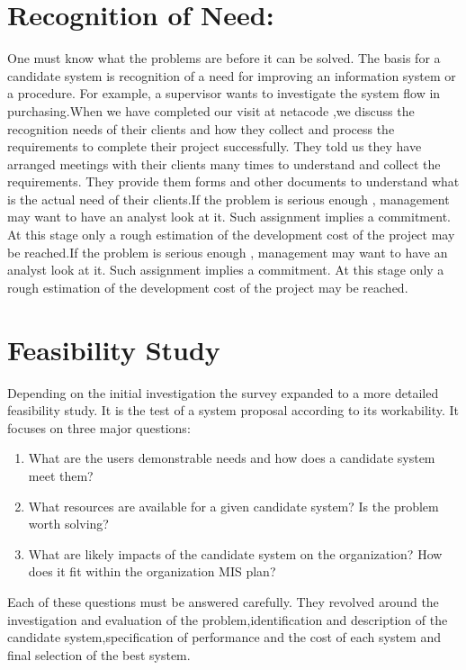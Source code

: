 \documentclass[a4paper,12pt]{report}
\begin{document}
\section{Recognition of Need: }
One must know what the problems are before it can be solved. The basis for a candidate system is recognition of a need for improving an information system or a procedure. For example, a supervisor wants to investigate the system flow in purchasing.When we have completed our visit at netacode ,we discuss the recognition needs of their clients and how they collect and process the requirements to complete their project  successfully. They told us they have arranged meetings with their clients many times to understand and collect the requirements. They provide them forms and other documents to understand what is the actual need of their clients.If the problem is serious enough , management may want to have an analyst look at it. Such assignment  implies a commitment. At this stage only a rough estimation of the development cost of the project may be reached.If the problem is serious enough , management may want to have an analyst look at it. Such assignment  implies a commitment. At this stage only a rough estimation of the development cost of the project may be reached.
\section{Feasibility Study}
Depending on the initial investigation the survey expanded to a more detailed feasibility study. It is the test of a system proposal according to its workability. It focuses on three major questions:
\begin{enumerate}
	\item 	What are the users demonstrable needs and how does a candidate system meet them?
	\item	What resources are available for a given candidate system? Is the problem worth solving?
	\item	What are likely impacts of the candidate system on the organization? How does it fit within the organization MIS plan?
	\end{enumerate}
Each of these questions must be answered carefully. They revolved around the investigation and evaluation of the problem,identification and description of the candidate system,specification of performance and the cost of each system and final selection of the best system.\\ \\
\end{document}
